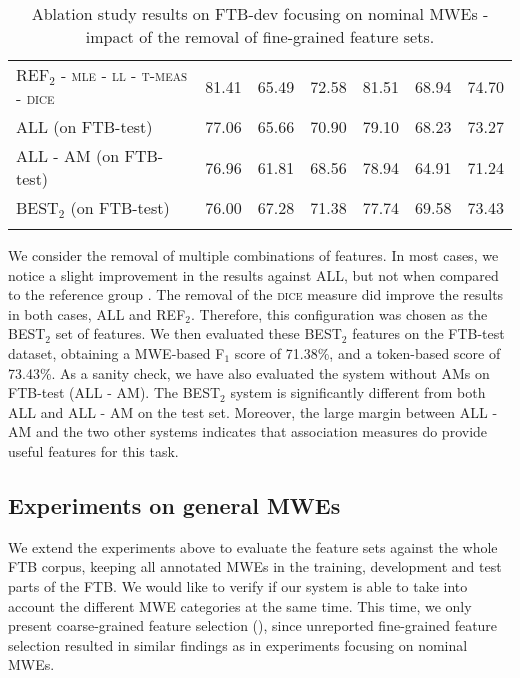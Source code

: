 \documentclass[output=paper,modfonts]{langscibook}
\begin{document}
\begin{table*}
\begin{tabular}{l@{~~~}c@{~~~}c@{~~~}c@{~~~~~~~~}c@{~~~}c@{~~~}c}
\textsc{REF$_2$} - \textsc{mle} - \textsc{ll} - \textsc{t-meas} - \textsc{dice} & 81.41 & 65.49 & 72.58 & 81.51 & 68.94 & 74.70 \\ %
\lspbottomrule
\textsc{ALL} (on FTB-test) & 77.06 & 65.66 & 70.90 & 79.10 & 68.23 & 73.27 \\ 
\textsc{ALL - \textsc{AM}} (on FTB-test) & 76.96 & 61.81 & 68.56 & 78.94 & 64.91 & 71.24 \\ 
\textsc{BEST$_2$} (on FTB-test) & 76.00 & 67.28 & 71.38 & 77.74 & 69.58 & 73.43 \\ 
\lspbottomrule
\end{tabular}
\caption{Ablation study results on FTB-dev focusing on nominal MWEs - impact of the removal of fine-grained feature sets.}
\label{tab:ftbNMWEsFine}
\end{table*}

We consider the removal of multiple combinations of features. In most cases, we notice a slight improvement in the results against ALL, but not when compared to the reference group . %
The removal of the \textsc{dice} measure did improve the results in both cases, ALL and REF$_2$. Therefore, this configuration was chosen as the BEST$_2$ set of features.
We then evaluated these BEST$_2$ features on the FTB-test dataset, obtaining a MWE-based F$_1$ score of 71.38\%, and a token-based score of 73.43\%. As a sanity check, we have also evaluated the system without AMs on FTB-test (\textsc{ALL - \textsc{AM}}). The \textsc{BEST$_2$} system is significantly different from both \textsc{ALL} and \textsc{ALL - \textsc{AM}} on the test set. Moreover, the large margin between \textsc{ALL - \textsc{AM}} and the two other systems indicates that association measures do provide useful features for this task.



\subsection{Experiments on general MWEs}
\label{schol:sec:results-general}

We extend the experiments above to evaluate the feature sets against the whole FTB corpus, keeping all annotated MWEs in the training, development and test parts of the FTB. We would like to verify if our system is able to take into account the different MWE categories at the same time. This time, we only present coarse-grained feature selection (), since unreported fine-grained feature selection resulted in similar findings as in experiments focusing on nominal MWEs.
\end{document}
